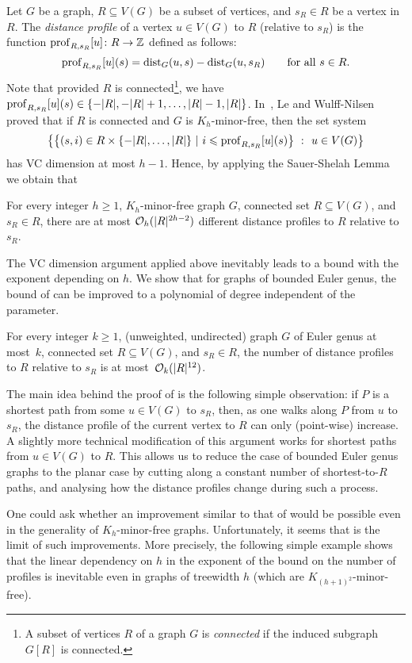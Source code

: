 Let $G$ be a graph, $R \subseteq V(G)$ be a subset of vertices, and $s_R \in R$ be a vertex in $R$.
The \emph{distance profile} of a vertex $u \in V(G)$ to $R$ (relative to $s_R$)
  is the function $\mathrm{prof}_{R,s_R}[u] \colon R \to \mathbb{Z}$ defined as follows:
  \[ \mathrm{prof}_{R,s_R}[u](s) = \mathrm{dist}_G(u,s) - \mathrm{dist}_G(u,s_R)\qquad \textrm{for all }s\in R. \]
Note that provided $R$ is connected\footnote{A subset of vertices $R$ of a graph $G$ is {\em{connected}} if the induced subgraph $G[R]$ is connected.}, we have
$\mathrm{prof}_{R,s_R}[u](s) \in \{-|R|,-|R|+1,\ldots,|R|-1,|R|\}$. In~\cite{LeW24},
Le and Wulff-Nilsen proved that if $R$ is connected and $G$ is $K_h$-minor-free, then
the set system $$\left\{ \left\{(s,i) \in R \times \{-|R|,\ldots,|R|\}~|~i \leqslant \mathrm{prof}_{R,s_R}[u](s)\right\}~\colon~u \in V(G)\right\}$$ has VC dimension at most $h-1$. Hence, by applying the Sauer-Shelah Lemma we obtain that
\begin{theorem}\label{thm:distprofiles-LeW24}
For every integer $h\geq 1$, $K_h$-minor-free graph $G$, connected set $R \subseteq V(G)$, and  $s_R \in R$, there are at most $\mathcal{O}_h(|R|^{2h-2})$
different distance profiles to $R$ relative to $s_R$. 
\end{theorem}
The VC dimension argument applied above inevitably leads to a bound with the exponent depending on $h$.
We show that for  graphs of bounded Euler genus, the bound of 
can be improved to a polynomial of degree independent of the parameter.
\begin{theorem}\label{thm:distprofiles}
For every integer $k\geq 1$, (unweighted, undirected) graph $G$ of Euler genus at most~$k$, connected set $R \subseteq V(G)$, and $s_R \in R$,
the number of distance profiles to $R$ relative to $s_R$
is at most~$\mathcal{O}_k(|R|^{12})$.
\end{theorem}
The main idea behind the proof of  is the following simple
observation:
if $P$ is a shortest path from some $u \in V(G)$ to $s_R$, then, as one walks along $P$
from $u$ to $s_R$, the distance profile of the current vertex to $R$ can only (point-wise) increase.
A slightly more technical modification of this argument works for shortest paths
from $u \in V(G)$ to $R$. This allows us to reduce the case of bounded Euler genus graphs
to the planar case by cutting along a constant number of shortest-to-$R$ paths,
and analysing how the distance profiles change during such a process.

One could ask whether an improvement similar to that of 
would be possible even in the generality of $K_h$-minor-free graphs.
Unfortunately, it seems that  is the limit of such improvements. More precisely, the following simple example shows that the linear dependency on $h$ in the exponent of the bound on the number of profiles is inevitable even in graphs of treewidth $h$ (which are  $K_{(h+1)^2}$-minor-free).


